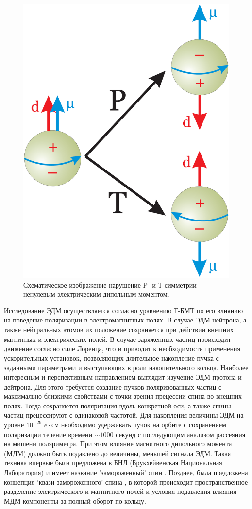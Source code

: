 \begin{figure}
	\centering
	\includegraphics[width=0.4\linewidth]{images/4_EDM_P_T}
	\caption{Схематическое изображение нарушение P- и Т-симметрии ненулевым электрическим дипольным моментом.}
	\label{fig:4edmpt}
\end{figure}

\par	Исследование ЭДМ осуществляется согласно уравнению Т-БМТ по его влиянию на поведение поляризации в электромагнитных полях. В случае ЭДМ нейтрона, а также нейтральных атомов их положение сохраняется при действии внешних магнитных и электрических полей. В случае заряженных частиц происходит движение согласно силе Лоренца, что и приводит к необходимости применения ускорительных установок, позволяющих длительное накопление пучка с заданными параметрами и выступающих в роли накопительного кольца. Наиболее интересным и перспективным направлением выглядит изучение ЭДМ протона и дейтрона. Для этого требуется создание пучков поляризованных частиц с максимально близкими свойствами с точки зрения прецессии спина во внешних полях. Тогда сохраняется поляризация вдоль конкретной оси, а также спины частиц прецессируют с одинаковой частотой. Для накопления величины ЭДМ на уровне $10^{-29}$ $e\cdot \text{см}$ необходимо удерживать пучок на орбите с сохранением поляризации течение времени $\sim1000$ секунд с последующим анализом рассеяния на мишени поляриметра. При этом влияние магнитного дипольного момента (МДМ) должно быть подавлено до величины, меньшей сигнала ЭДМ. Такая техника впервые была предложена в БНЛ (Брукхейвенская Национальная Лаборатория) и имеет название 'замороженный' спин \autocite{Farley:edm}. Позднее, была предложена концепция ’квази-замороженного’ спина \autocite{QFS}, в которой происходит пространственное разделение электрического и магнитного полей и условия подавления влияния МДМ-компоненты за полный оборот по кольцу.

